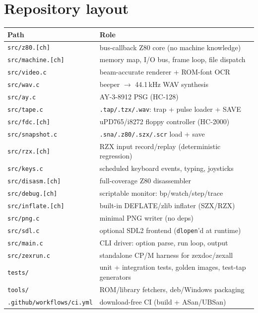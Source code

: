 \documentclass[11pt,a4paper]{article}
\begin{document}
\section{Repository layout}

\begin{center}\footnotesize
\begin{tabular}{ll}
\toprule
\textbf{Path} & \textbf{Role} \\
\midrule
\texttt{src/z80.[ch]}        & bus-callback Z80 core (no machine knowledge) \\
\texttt{src/machine.[ch]}    & memory map, I/O bus, frame loop, file dispatch \\
\texttt{src/video.c}         & beam-accurate renderer + ROM-font OCR \\
\texttt{src/wav.c}           & beeper $\rightarrow$ 44.1\,kHz WAV synthesis \\
\texttt{src/ay.c}            & AY-3-8912 PSG (HC-128) \\
\texttt{src/tape.c}          & \texttt{.tap/.tzx/.wav}: trap + pulse loader + SAVE \\
\texttt{src/fdc.[ch]}        & uPD765/i8272 floppy controller (HC-2000) \\
\texttt{src/snapshot.c}      & \texttt{.sna/.z80/.szx/.scr} load + save \\
\texttt{src/rzx.[ch]}        & RZX input record/replay (deterministic regression) \\
\texttt{src/keys.c}          & scheduled keyboard events, typing, joysticks \\
\texttt{src/disasm.[ch]}     & full-coverage Z80 disassembler \\
\texttt{src/debug.[ch]}      & scriptable monitor: bp/watch/step/trace \\
\texttt{src/inflate.[ch]}    & built-in DEFLATE/zlib inflater (SZX/RZX) \\
\texttt{src/png.c}           & minimal PNG writer (no deps) \\
\texttt{src/sdl.c}           & optional SDL2 frontend (\texttt{dlopen}'d at runtime) \\
\texttt{src/main.c}          & CLI driver: option parse, run loop, output \\
\texttt{src/zexrun.c}        & standalone CP/M harness for zexdoc/zexall \\
\midrule
\texttt{tests/}              & unit + integration tests, golden images, test-tap generators \\
\texttt{tools/}              & ROM/library fetchers, deb/Windows packaging \\
\texttt{.github/workflows/ci.yml} & download-free CI (build + ASan/UBSan) \\
\bottomrule
\end{tabular}
\end{center}
\end{document}
